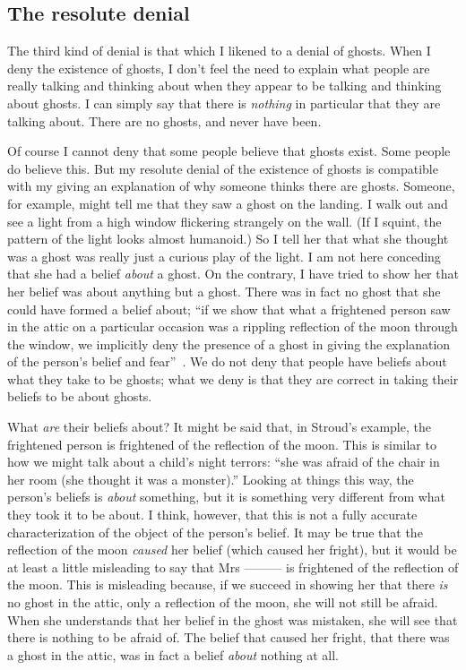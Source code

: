 \documentclass[11pt]{article}
\begin{document}
\begin{spacing}{1.5}
\section{The resolute denial}
\label{resolute}
The third kind of denial is that which I likened to a denial of ghosts. When I deny the existence of ghosts, I don't feel the need to explain what people are really talking and thinking about when they appear to be talking and thinking about ghosts. I can simply say that there is {\em nothing} in particular that they are talking about. There are no ghosts, and never have been.

Of course I cannot deny that some people believe that ghosts exist. Some people do believe this. But my resolute denial of the existence of ghosts is compatible with my giving an explanation of why someone thinks there are ghosts. Someone, for example, might tell me that they saw a ghost on the landing. I walk out and see a light from a high window flickering strangely on the wall. (If I squint, the pattern of the light looks almost humanoid.) So I tell her that what she thought was a ghost was really just a curious play of the light. I am not here conceding that she had a belief {\em about} a ghost. On the contrary, I have tried to show her that her belief was about anything but a ghost. There was in fact no ghost that she could have formed a belief about; ``if we show that what a frightened person saw in the attic on a particular occasion was a rippling reflection of the moon through the window, we implicitly deny the presence of a ghost in giving the explanation of the person's belief and fear''~\citep[76]{stroud2000a}. We do not deny that people have beliefs about what they take to be ghosts; what we deny is that they are correct in taking their beliefs to be about ghosts.

What {\em are} their beliefs about? It might be said that, in Stroud's example, the frightened person is frightened of the reflection of the moon. This is similar to how we might talk about a child's night terrors: ``she was afraid of the chair in her room (she thought it was a monster).'' Looking at things this way, the person's beliefs is {\em about} something, but it is something very different from what they took it to be about. I think, however, that this is not a fully accurate characterization of the object of the person's belief. It may be true that the reflection of the moon {\em caused} her belief (which caused her fright), but it would be at least a little misleading to say that Mrs --------- is frightened of the reflection of the moon. This is misleading because, if we succeed in showing her that there {\em is} no ghost in the attic, only a reflection of the moon, she will not still be afraid. When she understands that her belief in the ghost was mistaken, she will see that there is nothing to be afraid of. The belief that caused her fright, that there was a ghost in the attic, was in fact a belief {\em about} nothing at all.


\end{spacing}
\end{document}
